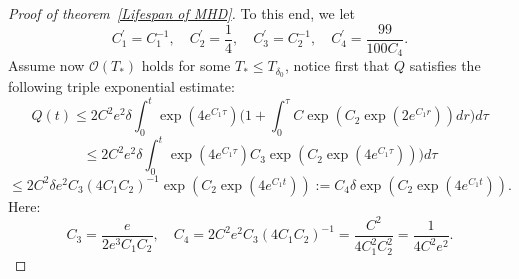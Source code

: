 \documentclass[12pt,letterpaper]{article}
\theoremstyle{plain}
\begin{document}
\begin{proof}[Proof of theorem~\ref{Lifespan of MHD}]
To this end, we let
\begin{equation*}
C_1^\prime=C_1^{-1},\quad C_2^\prime=\frac{1}{4},\quad  C_3^\prime=C_2^{-1},\quad C_4^\prime=\frac{99}{100C_4}.   
\end{equation*}
Assume now $\mathscr O(T_*)$ holds for some $T_*\le T_{\delta_0}$, notice first that $Q$ satisfies the following triple exponential estimate:
\begin{equation*}
 Q(t)\le   2C^2e^2\delta \int_0^t\exp(4e^{C_1\tau})\bigg(1+\int_0^\tau C\exp(C_2\exp(2e^{C_1r}))dr\bigg)d\tau
\end{equation*}
\begin{equation*}
 \le 2C^2e^2\delta \int_0^t  \exp(4e^{C_1\tau})C_3\exp(C_2\exp(4e^{C_1\tau})))d\tau
\end{equation*}
\begin{equation*}
 \le   2C^2\delta e^2 C_3(4C_1C_2)^{-1} \exp(C_2\exp(4e^{C_1 t})):=C_4\delta\exp(C_2\exp(4e^{C_1 t})).
\end{equation*}
Here:
\begin{equation*}
 C_3= \frac{e}{2e^3C_1C_2},\quad C_4=  2C^2 e^2 C_3(4C_1C_2)^{-1} =\frac{C^2}{4C_1^2C_2^2}=\frac{1}{4C^2e^2}.
\end{equation*}


\end{proof}
\end{document}
